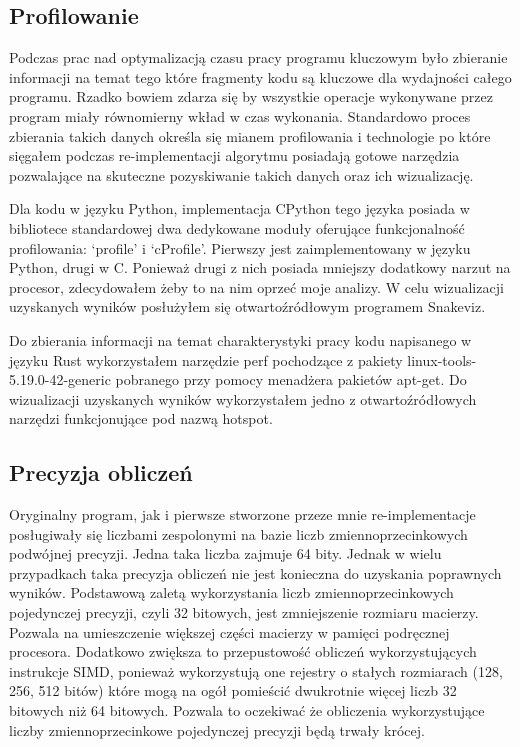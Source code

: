 \documentclass[11pt, a4paper]{article}
\begin{document}
\begin{sloppypar}
    \subsection{Profilowanie}
    Podczas prac nad optymalizacją czasu pracy programu kluczowym było zbieranie informacji
    na temat tego które fragmenty kodu są kluczowe dla wydajności całego programu.
    Rzadko bowiem zdarza się by wszystkie operacje wykonywane przez program miały
    równomierny wkład w czas wykonania. Standardowo proces zbierania takich danych określa
    się mianem profilowania i technologie po które sięgałem podczas re-implementacji algorytmu
    posiadają gotowe narzędzia pozwalające na skuteczne pozyskiwanie takich danych oraz ich
    wizualizację.

    Dla kodu w języku Python, implementacja CPython tego języka posiada w bibliotece
    standardowej dwa dedykowane moduły oferujące funkcjonalność profilowania: `profile' i
    `cProfile'. Pierwszy jest zaimplementowany w języku Python, drugi w C. Ponieważ
    drugi z nich posiada mniejszy dodatkowy narzut na procesor, zdecydowałem żeby to na nim
    oprzeć moje analizy. W celu wizualizacji uzyskanych wyników posłużyłem się
    otwartoźródłowym programem Snakeviz\cite{Snakeviz_PyPI}.

    Do zbierania informacji na temat charakterystyki pracy kodu napisanego w języku Rust
    wykorzystałem narzędzie perf pochodzące z pakiety linux-tools-5.19.0-42-generic
    pobranego przy pomocy menadżera pakietów apt-get. Do wizualizacji uzyskanych wyników
    wykorzystałem jedno z otwartoźródłowych narzędzi funkcjonujące pod nazwą hotspot\cite{HOTSPOT}.

    \subsection{Precyzja obliczeń}
    Oryginalny program, jak i pierwsze stworzone przeze mnie re-implementacje posługiwały
    się liczbami zespolonymi na bazie liczb zmiennoprzecinkowych podwójnej precyzji.
    Jedna taka liczba zajmuje 64 bity. Jednak w wielu przypadkach taka precyzja obliczeń
    nie jest konieczna do uzyskania poprawnych wyników. Podstawową zaletą wykorzystania
    liczb zmiennoprzecinkowych pojedynczej precyzji, czyli 32 bitowych, jest
    zmniejszenie rozmiaru macierzy. Pozwala na umieszczenie większej części macierzy w pamięci
    podręcznej procesora. Dodatkowo zwiększa to przepustowość obliczeń wykorzystujących
    instrukcje SIMD, ponieważ wykorzystują one rejestry o stałych rozmiarach (128, 256,
    512 bitów) które mogą na ogół pomieścić dwukrotnie więcej liczb 32 bitowych niż 64 bitowych.
    Pozwala to oczekiwać że obliczenia wykorzystujące liczby zmiennoprzecinkowe
    pojedynczej precyzji będą trwały krócej.


\end{sloppypar}
\end{document}
